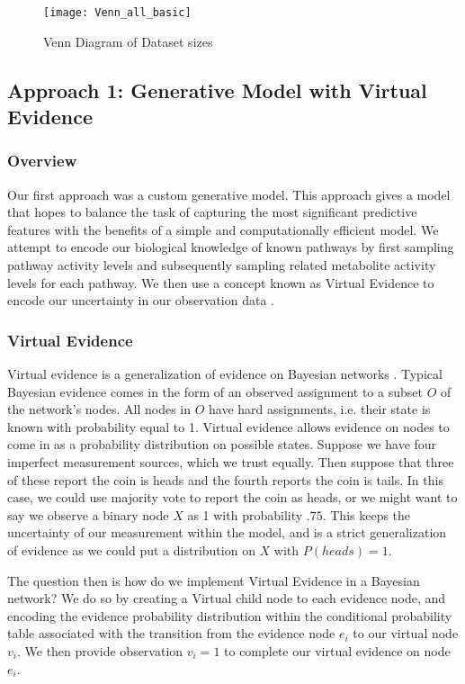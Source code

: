 \documentclass[11pt]{article}
\begin{document}
\begin{figure}[h]
\texttt{[image: Venn\_all\_basic]}
\centering
\caption{Venn Diagram of Dataset sizes}
\label{fig:venn1}
\end{figure}
\subsection{Approach 1: Generative Model with Virtual Evidence}

\subsubsection{Overview}

Our first approach was a custom generative model. This approach gives a model that hopes to balance the task of capturing the most significant predictive features with the benefits of a simple and computationally efficient model. We attempt to encode our biological knowledge of known pathways by first sampling pathway activity levels and subsequently sampling related metabolite activity levels for each pathway. We then use a concept known as Virtual Evidence to encode our uncertainty in our observation data \cite{Bilmes04onvirtual}.

\subsubsection{Virtual Evidence}

Virtual evidence is a generalization of evidence on Bayesian networks \cite{Bilmes04onvirtual}. Typical Bayesian evidence comes in the form of an observed assignment to a subset $O$ of the network's nodes. All nodes in $O$ have hard assignments, i.e. their state is known with probability equal to 1. Virtual evidence allows evidence on nodes to come in as a probability distribution on possible states. Suppose we have four imperfect measurement sources, which we trust equally. Then suppose that three of these report the coin is heads and the fourth reports the coin is tails. In this case, we could use majority vote to report the coin as heads, or we might want to say we observe a binary node $X$ as 1 with probability $.75$. This keeps the uncertainty of our measurement within the model, and is a strict generalization of evidence as we could put a distribution on $X$ with $P(heads) = 1$. 

The question then is how do we implement Virtual Evidence in a Bayesian network? We do so by creating a Virtual child node to each evidence node, and encoding the evidence probability distribution within the conditional probability table associated with the transition from the evidence node $e_i$ to our virtual node $v_i$. We then provide observation $v_i = 1$ to complete our virtual evidence on node $e_i$. 
\end{document}
